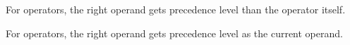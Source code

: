 \begin{frame}{}
  \begin{center}
    For  operators, the right operand
    gets  precedence level than the operator itself.
  \end{center}

  \vspace{0.30cm}
  \begin{center}
  \end{center}

  \vspace{0.10cm}
  \begin{center}
    For  operators, the right operand
    gets  precedence level as the current operand.
  \end{center}
\end{frame}
